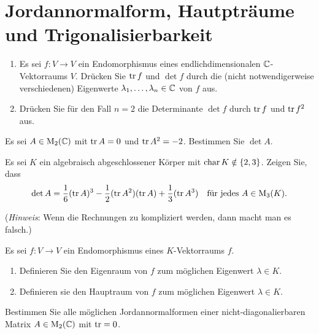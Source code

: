 \section{Jordannormalform, Hautpträume und Trigonalisierbarkeit}


\begin{question}
  \begin{enumerate}[leftmargin=*]
    \item
      Es sei $f \colon V \to V$ ein Endomorphismus eines endlichdimensionalen $\mathbb{C}$-Vektorraums $V$.
      Drücken Sie $\operatorname{tr} f$ und $\det f$ durch die (nicht notwendigerweise verschiedenen) Eigenwerte $\lambda_1, \dotsc, \lambda_n \in \mathbb{C}$ von $f$ aus.
    \item
      Drücken Sie für den Fall $n = 2$ die Determinante $\det f$ durch $\operatorname{tr} f$ und $\operatorname{tr} f^2$ aus.
  \end{enumerate}
\end{question}


\begin{question}
  Es sei $A \in \operatorname{M}_2(\mathbb{C})$ mit $\operatorname{tr} A = 0$ und $\operatorname{tr} A^2 = -2$.
  Bestimmen Sie $\det A$.
\end{question}


\begin{question}
  Es sei $K$ ein algebraisch abgeschlossener Körper mit $\operatorname{char} K \notin \{2,3\}$.
  Zeigen Sie, dass
  \[
    \det A = \frac{1}{6} (\operatorname{tr} A)^3 - \frac{1}{2} (\operatorname{tr} A^2)(\operatorname{tr} A) + \frac{1}{3} (\operatorname{tr} A^3)
    \quad
    \text{für jedes $A \in \operatorname{M}_3(K)$}.
  \]
  
  (\emph{Hinweis}:
   Wenn die Rechnungen zu kompliziert werden, dann macht man es falsch.)
\end{question}


\begin{question}
  Es sei $f \colon V \to V$ ein Endomorphismus eines $K$-Vektorraums $f$.
  \begin{enumerate}
    \item
      Definieren Sie den Eigenraum von $f$ zum möglichen Eigenwert $\lambda \in K$.
    \item
      Definieren sie den Hauptraum von $f$ zum möglichen Eigenwert $\lambda \in K$.
  \end{enumerate}
\end{question}



\begin{question}
  Bestimmen Sie alle möglichen Jordannormalformen einer nicht-diagonalierbaren Matrix $A \in \operatorname{M}_2(\mathbb{C})$ mit $\operatorname{tr} = 0$.
\end{question}


